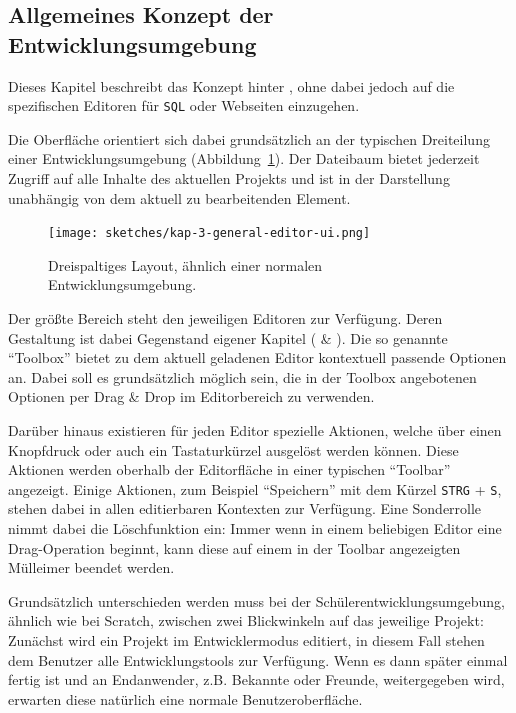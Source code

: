 \subsection{Allgemeines Konzept der Entwicklungsumgebung}
\label{sec:design-general-concept}

Dieses Kapitel beschreibt das Konzept hinter \idename{}, ohne dabei jedoch auf die spezifischen Editoren für \texttt{SQL} oder Webseiten einzugehen.

Die Oberfläche orientiert sich dabei grundsätzlich an der typischen Dreiteilung einer Entwicklungsumgebung (Abbildung~\ref{fig:ui-sketch-general}). Der Dateibaum bietet jederzeit Zugriff auf alle Inhalte des aktuellen Projekts und ist in der Darstellung unabhängig von dem aktuell zu bearbeitenden Element.

\begin{figure}[h]
  \centering \texttt{[image: sketches/kap-3-general-editor-ui.png]}
  \caption{Dreispaltiges Layout, ähnlich einer normalen Entwicklungsumgebung.}
  \label{fig:ui-sketch-general}
\end{figure}

Der größte Bereich steht den jeweiligen Editoren zur Verfügung. Deren Gestaltung ist dabei Gegenstand eigener Kapitel ( \& ). Die so genannte "`Toolbox"' bietet zu dem aktuell geladenen Editor kontextuell passende Optionen an. Dabei soll es grundsätzlich möglich sein, die in der Toolbox angebotenen Optionen per Drag \& Drop im Editorbereich zu verwenden.

Darüber hinaus existieren für jeden Editor spezielle Aktionen, welche über einen Knopfdruck oder auch ein Tastaturkürzel ausgelöst werden können. Diese Aktionen werden oberhalb der Editorfläche in einer typischen "`Toolbar"' angezeigt. Einige Aktionen, zum Beispiel "`Speichern"' mit dem Kürzel \texttt{STRG} + \texttt{S}, stehen dabei in allen editierbaren Kontexten zur Verfügung. Eine Sonderrolle nimmt dabei die Löschfunktion ein: Immer wenn in einem beliebigen Editor eine Drag-Operation beginnt, kann diese auf einem in der Toolbar angezeigten Mülleimer beendet werden.

Grundsätzlich unterschieden werden muss bei der Schülerentwicklungsumgebung, ähnlich wie bei Scratch, zwischen zwei Blickwinkeln auf das jeweilige Projekt: Zunächst wird ein Projekt im Entwicklermodus editiert, in diesem Fall stehen dem Benutzer alle Entwicklungstools zur Verfügung. Wenn es dann später einmal fertig ist und an Endanwender, z.B. Bekannte oder Freunde, weitergegeben wird, erwarten diese natürlich eine normale Benutzeroberfläche.

